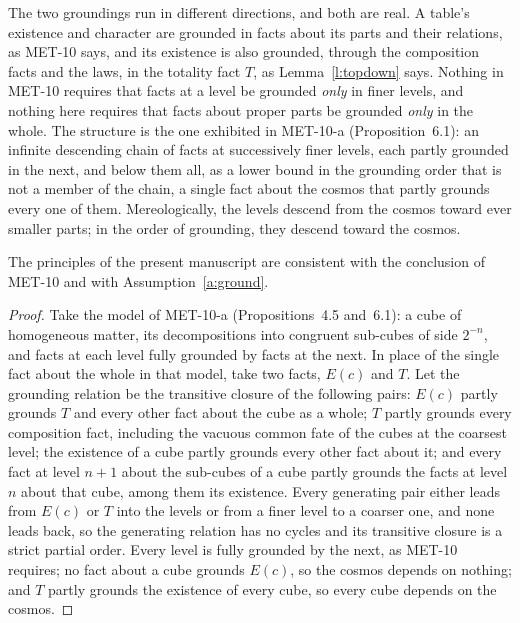 \documentclass{situationist-preprint}
\begin{document}
The two groundings run in different directions, and both are real. A table's existence and character are grounded in facts about its parts and their relations, as MET-10 says, and its existence is also grounded, through the composition facts and the laws, in the totality fact $T$, as Lemma~\ref{l:topdown} says. Nothing in MET-10 requires that facts at a level be grounded \emph{only} in finer levels, and nothing here requires that facts about proper parts be grounded \emph{only} in the whole. The structure is the one exhibited in MET-10-a (Proposition~6.1): an infinite descending chain of facts at successively finer levels, each partly grounded in the next, and below them all, as a lower bound in the grounding order that is not a member of the chain, a single fact about the cosmos that partly grounds every one of them. Mereologically, the levels descend from the cosmos toward ever smaller parts; in the order of grounding, they descend toward the cosmos.

\begin{proposition}\label{p:joint}
The principles of the present manuscript are consistent with the conclusion of MET-10 and with Assumption~\ref{a:ground}.
\end{proposition}

\begin{proof}
Take the model of MET-10-a (Propositions~4.5 and~6.1): a cube of homogeneous matter, its decompositions into congruent sub-cubes of side $2^{-n}$, and facts at each level fully grounded by facts at the next. In place of the single fact about the whole in that model, take two facts, $E(c)$ and $T$. Let the grounding relation be the transitive closure of the following pairs: $E(c)$ partly grounds $T$ and every other fact about the cube as a whole; $T$ partly grounds every composition fact, including the vacuous common fate of the cubes at the coarsest level; the existence of a cube partly grounds every other fact about it; and every fact at level $n+1$ about the sub-cubes of a cube partly grounds the facts at level $n$ about that cube, among them its existence. Every generating pair either leads from $E(c)$ or $T$ into the levels or from a finer level to a coarser one, and none leads back, so the generating relation has no cycles and its transitive closure is a strict partial order. Every level is fully grounded by the next, as MET-10 requires; no fact about a cube grounds $E(c)$, so the cosmos depends on nothing; and $T$ partly grounds the existence of every cube, so every cube depends on the cosmos.
\end{proof}
\end{document}
